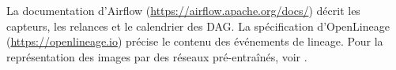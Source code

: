 \begin{plusloin}
La documentation d'Airflow (\url{https://airflow.apache.org/docs/}) décrit les capteurs, les relances et le calendrier des DAG. La spécification d'OpenLineage (\url{https://openlineage.io}) précise le contenu des événements de lineage. Pour la représentation des images par des réseaux pré-entraînés, voir \citet{howard2019}.
\end{plusloin}
